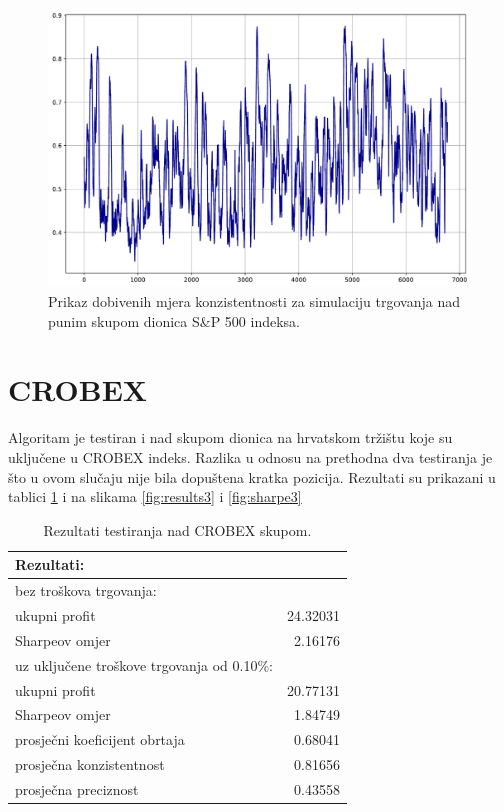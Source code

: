 \documentclass[lmodern, utf8, diplomski, numeric]{fer}
\begin{document}
  \begin{figure}[p]
    \centering
    \includegraphics[width=\linewidth]{graphics/sp500full-cons.pdf}
    \caption{Prikaz dobivenih mjera konzistentnosti za simulaciju trgovanja nad punim skupom dionica S\&P 500 indeksa.}
    \label{fig:sharpe2}
  \end{figure}
  \pagebreak

  \section{CROBEX}
  Algoritam je testiran i nad skupom dionica na hrvatskom tržištu koje su uključene u CROBEX indeks.
  Razlika u odnosu na prethodna dva testiranja je što u ovom slučaju nije bila dopuštena kratka pozicija.
  Rezultati su prikazani u tablici \ref{table:crobex-results} i na slikama \ref{fig:results3} i \ref{fig:sharpe3}
  
  \begin{table}[h]
    \centering
    \caption{Rezultati testiranja nad CROBEX skupom.}
    \label{table:crobex-results}
    \begin{tabular}{lr}
      \toprule
      Rezultati: & \\
      \midrule
      bez troškova trgovanja: & \\
      ukupni profit & 24.32031 \\
      Sharpeov omjer &  2.16176 \\
      \midrule
      {uz uključene troškove trgovanja od 0.10\%:} & \\
      ukupni profit & 20.77131 \\
      Sharpeov omjer & 1.84749 \\
      \midrule
      prosječni koeficijent obrtaja & 0.68041\\
      prosječna konzistentnost & 0.81656 \\
      prosječna preciznost & 0.43558 \\
      \bottomrule
    \end{tabular}
  \end{table}
\end{document}
